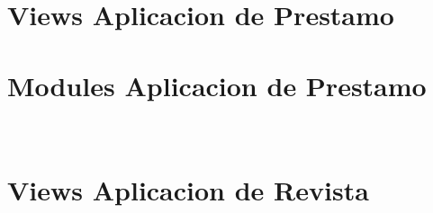 \documentclass[letterpaper,10pt,spanish]{sphinxmanual}
\begin{document}
\section{Views Aplicacion de Prestamo}
\label{\detokenize{modules/prestamo/views:module-prestamo.views}}\label{\detokenize{modules/prestamo/views:views-aplicacion-de-prestamo}}\label{\detokenize{modules/prestamo/views::doc}}

\section{Modules Aplicacion de Prestamo}
\label{\detokenize{modules/prestamo/models:module-prestamo.models}}\label{\detokenize{modules/prestamo/models:modules-aplicacion-de-prestamo}}\label{\detokenize{modules/prestamo/models::doc}}

\begin{fulllineitems}
\label{\detokenize{modules/prestamo/models:prestamo.models.Prestamo}}~

\begin{fulllineitems}
\label{\detokenize{modules/prestamo/models:prestamo.models.Prestamo.DoesNotExist}}
\end{fulllineitems}


\begin{fulllineitems}
\label{\detokenize{modules/prestamo/models:prestamo.models.Prestamo.MultipleObjectsReturned}}
\end{fulllineitems}


\end{fulllineitems}



\section{Views Aplicacion de Revista}
\label{\detokenize{modules/revista/views:module-revista.views}}\label{\detokenize{modules/revista/views:views-aplicacion-de-revista}}\label{\detokenize{modules/revista/views::doc}}
\end{document}
